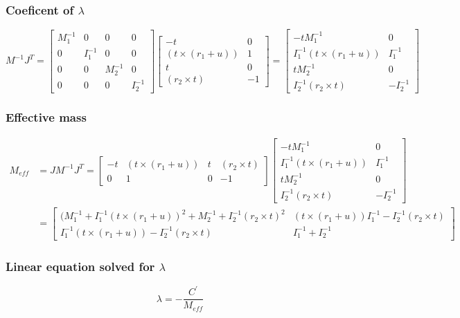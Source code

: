 \documentclass{article}
\begin{document}
	\subsubsection{Coeficent of $\lambda$}
	$$
		M^{-1}J^T=	
		\begin{bmatrix}
			M_1^{-1} 	& 0 		& 0 		& 0\\
			0 			& I_1^{-1} 	& 0 		& 0\\
			0 			& 0 		& M_2^{-1} 	& 0\\
			0 			& 0 		& 0 		& I_2^{-1}
		\end{bmatrix}
		\begin{bmatrix}
			-t					& 0\\
			(t\times(r_1+u))	& 1\\
			t					& 0\\
			(r_2\times t)		& -1
		\end{bmatrix}
		=
		\begin{bmatrix}
			-tM_1^{-1}					& 0\\
			I_1^{-1}(t\times(r_1+u))	& I_1^{-1}\\
			tM_2^{-1}					& 0\\
			I_2^{-1}(r_2\times t)		& -I_2^{-1}
		\end{bmatrix}
	$$
	\subsubsection{Effective mass}
	\begin{align*}
		M_{eff}&=JM^{-1}J^T=
		\begin{bmatrix}
			-t	& (t\times(r_1+u))	& t	& (r_2\times t)\\
			0	& 1					& 0	& -1
		\end{bmatrix}
		\begin{bmatrix}
			-tM_1^{-1}					& 0\\
			I_1^{-1}(t\times(r_1+u))	& I_1^{-1}\\
			tM_2^{-1}					& 0\\
			I_2^{-1}(r_2\times t)		& -I_2^{-1}
		\end{bmatrix}\\
		&=
		\begin{bmatrix}
			(M_1^{-1} + I_1^{-1}(t\times(r_1+u))^2 + M_2^{-1} + I_2^{-1}(r_2\times t)^2 & (t\times(r_1+u))I_1^{-1} - I_2^{-1}(r_2\times t)\\
			I_1^{-1}(t\times(r_1+u)) - I_2^{-1}(r_2\times t) & I_1^{-1} + I_2^{-1}
		\end{bmatrix}
	\end{align*}
	\subsubsection{Linear equation solved for $\lambda$}
		$$
		\lambda=-\frac{C^{'}}{M_{eff}}
		$$
\end{document}
